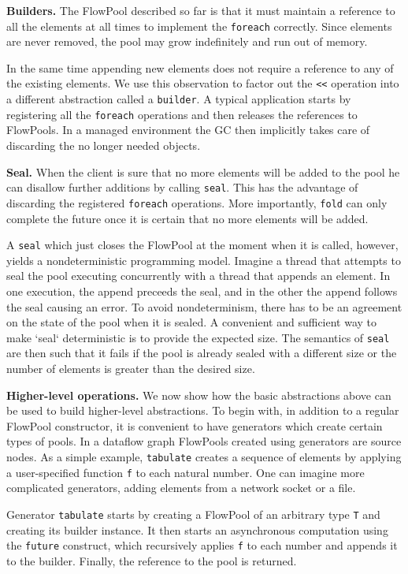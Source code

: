 \documentclass[runningheads,a4paper]{llncs}
\begin{document}
\textbf{Builders.}
The FlowPool described so far is that it must maintain a reference 
to all the elements at all times to implement the \verb=foreach=
correctly.
Since elements are never removed, the pool may grow indefinitely
and run out of memory.

In the same time appending new elements does not require a reference
to any of the existing elements.
We use this observation to factor out the \verb=<<= operation into
a different abstraction called a \verb=builder=.
A typical application starts by registering all the \verb=foreach=
operations and then releases the references to FlowPools.
In a managed environment the GC then implicitly takes care of
discarding the no longer needed objects.


\textbf{Seal.}
When the client is sure that no more elements will be added to the pool
he can disallow further additions by calling \verb=seal=.
This has the advantage of discarding the registered \verb=foreach=
operations.
More importantly, \verb=fold= can only complete the future
once it is certain that no more elements will be added.

A \verb=seal= which just closes the FlowPool at the moment when it
is called, however, yields a nondeterministic programming model.
Imagine a thread that attempts to seal the pool executing concurrently
with a thread that appends an element.
In one execution, the append preceeds the seal, and in the other
the append follows the seal causing an error.
To avoid nondeterminism, there has to be an agreement on the
state of the pool when it is sealed.
A convenient and sufficient way to make `seal` deterministic
is to provide the expected size.
The semantics of \verb=seal= are then such that it fails if the pool
is already sealed with a different size or the number of elements
is greater than the desired size.

\textbf{Higher-level operations.}
We now show how the basic abstractions above can be used
to build higher-level abstractions.
To begin with, in addition to a regular FlowPool constructor, it is
convenient to have generators which create certain types of pools.
In a dataflow graph FlowPools created using generators
are source nodes.
As a simple example, \verb=tabulate= creates a sequence of elements
by applying a user-specified function \verb=f= to each natural number.
One can imagine more complicated generators, adding elements from a
network socket or a file.

Generator \verb=tabulate= starts by creating a FlowPool of an
arbitrary type \verb=T= and creating its builder instance.
It then starts an asynchronous computation using the \verb=future=
construct, which recursively applies \verb=f= to each number and
appends it to the builder.
Finally, the reference to the pool is returned.
\end{document}

